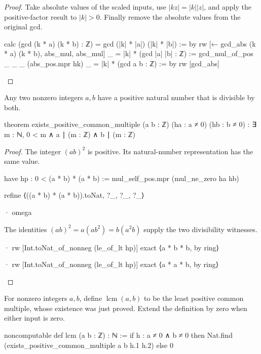 \begin{proof}

  Take absolute values of the scaled inputs, use $|kz|=|k||z|$, and apply the positive-factor
  result to $|k|>0$.
  Finally remove the absolute values from the original gcd.

  \begin{lean}
    calc
      (gcd (k * a) (k * b) : ℤ) = gcd (|k| * |a|) (|k| * |b|) := by
        rw [← gcd_abs (k * a) (k * b), abs_mul, abs_mul]
      _ = |k| * (gcd |a| |b| : ℤ) := gcd_mul_of_pos _ _ _ (abs_pos.mpr hk)
      _ = |k| * (gcd a b : ℤ) := by
        rw [gcd_abs]
  \end{lean}

\end{proof}

\begin{lemma}
  \label{ent:thm:positive-common-multiple}
  Any two nonzero integers $a,b$ have a positive natural number that is divisible by both.

  \begin{lean}
    theorem exists_positive_common_multiple (a b : ℤ) (ha : a ≠ 0) (hb : b ≠ 0) :
        ∃ m : ℕ, 0 < m ∧ a ∣ (m : ℤ) ∧ b ∣ (m : ℤ)
  \end{lean}
\end{lemma}

\begin{proof}
  The integer $(ab)^2$ is positive.
  Its natural-number representation has the same value.

  \begin{lean}
    have hp : 0 < (a * b) * (a * b) := mul_self_pos.mpr (mul_ne_zero ha hb)

    refine ⟨((a * b) * (a * b)).toNat, ?_, ?_, ?_⟩

    · omega
  \end{lean}

  The identities $(ab)^2=a(ab^2)=b(a^2b)$ supply the two divisibility witnesses.

  \begin{lean}
    · rw [Int.toNat_of_nonneg (le_of_lt hp)]
      exact ⟨a * b * b, by ring⟩

    · rw [Int.toNat_of_nonneg (le_of_lt hp)]
      exact ⟨a * a * b, by ring⟩
  \end{lean}
\end{proof}

\begin{definition}
  For nonzero integers $a,b$, define $\operatorname{lcm}(a,b)$ to be the least positive common
  multiple, whose existence was just proved.
  Extend the definition by zero when either input is zero.

  \begin{lean}
    noncomputable def lcm (a b : ℤ) : ℕ :=
      if h : a ≠ 0 ∧ b ≠ 0 then
        Nat.find (exists_positive_common_multiple a b h.1 h.2)
      else 0
  \end{lean}
\end{definition}

